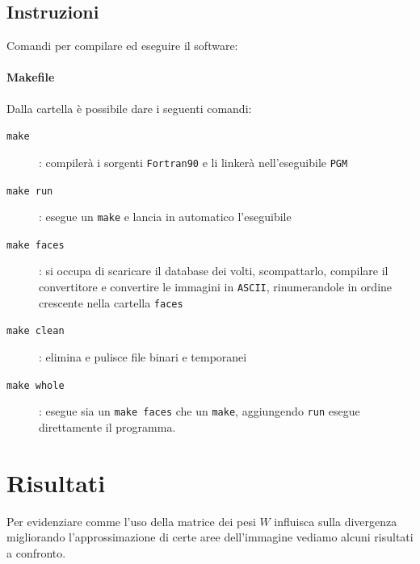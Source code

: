 \documentclass[a4paper]{article} %
\begin{document}
\subsection{Instruzioni}
Comandi per compilare ed eseguire il software:
\paragraph{Makefile}\label{makefile}
Dalla cartella è possibile dare i seguenti comandi:
\begin{description}
\item[\texttt{make}]: compilerà i sorgenti \texttt{Fortran90} e li linkerà nell'eseguibile \texttt{PGM}
\item[\texttt{make run}]: esegue un \texttt{make} e lancia in automatico l'eseguibile
\item[\texttt{make faces}]: si occupa di scaricare il database dei volti, scompattarlo, compilare il convertitore e convertire le immagini in \texttt{ASCII}, rinumerandole in ordine crescente nella cartella \texttt{faces}
\item[\texttt{make clean}]: elimina e pulisce file binari e temporanei
\item[\texttt{make whole}]: esegue sia un \texttt{make faces} che un \texttt{make}, aggiungendo \texttt{run} esegue direttamente il programma.
\end{description}


\section{Risultati}
Per evidenziare comme l'uso della matrice dei pesi $W$ influisca sulla divergenza migliorando l'approssimazione di certe aree dell'immagine vediamo alcuni risultati a confronto.
\end{document}
